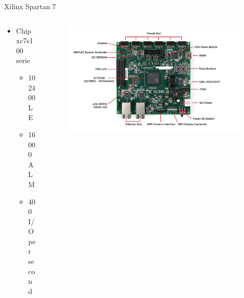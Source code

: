 \begin{frame}{Xilinx Spartan 7 \cite{sp701} \cite{fpga_resources}}
	\begin{columns}
    \begin{column}{0.5\textwidth} %
	    \begin{itemize}
	    \item Chip xc7s100 serie %
	    \begin{itemize}
	    	\item 102400 LE %
	   	 \item 16000 ALM %
	    	\item 400 I/O  per second %
	    \end{itemize}
	\end{itemize}
\end{column}
\begin{column}{.5\textwidth} %

\begin{figure}[!ht]
    \includegraphics[width=1\linewidth]{images/spartan7.jpg}
\end{figure}
\end{column}
\end{columns}
\end{frame}
